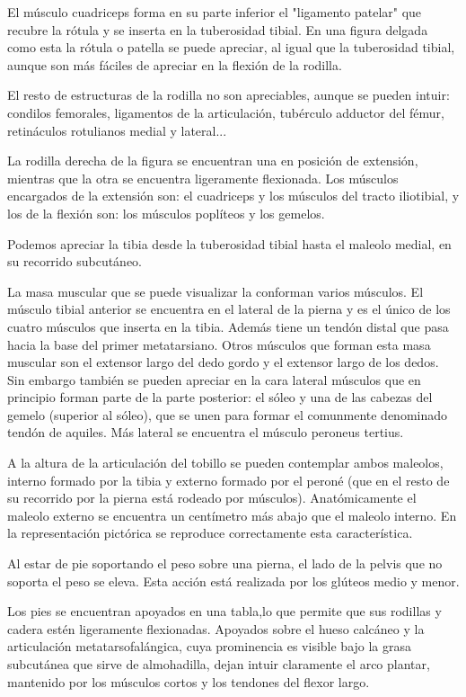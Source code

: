 El músculo cuadriceps forma en su parte inferior el "ligamento patelar" que recubre la rótula y se inserta en la tuberosidad tibial. En una figura delgada como esta la rótula o patella se puede apreciar, al igual que la tuberosidad tibial, aunque son más fáciles de apreciar en la flexión de la rodilla.

El resto de estructuras de la rodilla no son apreciables, aunque se pueden intuir: condilos femorales, ligamentos de la articulación, tubérculo adductor del fémur, retináculos rotulianos medial y lateral...

La rodilla derecha de la figura se encuentran una en posición de extensión, mientras que la otra se encuentra ligeramente flexionada. Los músculos encargados de la extensión son: el cuadriceps y los músculos del tracto iliotibial, y los de la flexión son: los músculos poplíteos y los gemelos.

Podemos apreciar la tibia desde la tuberosidad tibial hasta el maleolo medial, en su recorrido subcutáneo.

La masa muscular que se puede visualizar la conforman varios músculos. El músculo tibial anterior se encuentra en el lateral de la pierna y es el único de los cuatro músculos que inserta en la tibia. Además tiene un tendón distal que pasa hacia la base del primer metatarsiano. Otros músculos que forman esta masa muscular son el extensor largo del dedo gordo y el extensor largo de los dedos. Sin embargo también se pueden apreciar en la cara lateral músculos que en principio forman parte de la parte posterior: el sóleo y una de las cabezas del gemelo (superior al sóleo), que se unen para formar el comunmente denominado tendón de aquiles. Más lateral se encuentra el músculo peroneus tertius.

A la altura de la articulación del tobillo se pueden contemplar ambos maleolos, interno formado por la tibia y externo formado por el peroné (que en el resto de su recorrido por la pierna está rodeado por músculos). Anatómicamente el maleolo externo se encuentra un centímetro más abajo que el maleolo interno. En la representación pictórica se reproduce correctamente esta característica.

Al estar de pie soportando el peso sobre una pierna, el lado de la pelvis que no soporta el peso se eleva. Esta acción está realizada por los glúteos medio y menor.

Los pies se encuentran apoyados en una tabla,lo que permite que sus rodillas y cadera estén ligeramente flexionadas. Apoyados sobre el hueso calcáneo y la articulación metatarsofalángica, cuya prominencia es visible bajo la grasa subcutánea que sirve de almohadilla, dejan intuir claramente el arco plantar, mantenido por los músculos cortos y los tendones del flexor largo.

